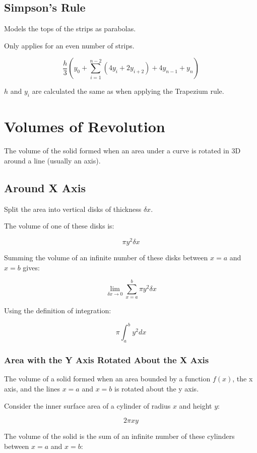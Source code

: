 \documentclass[a4paper,11pt]{report}
\begin{document}
\subsection{Simpson's Rule}

Models the tops of the strips as parabolas.

Only applies for an even number of strips.

$$
\frac{h}{3}(y_0 + \sum_{i = 1}^{n - 2} (4y_i + 2y_{i + 2}) + 4y_{n - 1} + y_n)
$$

$h$ and $y_i$ are calculated the same as when applying the Trapezium rule.


\section{Volumes of Revolution}

The volume of the solid formed when an area under a curve is rotated in 3D
around a line (usually an axis).

\subsection{Around X Axis}

Split the area into vertical disks of thickness $\delta x$.

The volume of one of these disks is:

$$
\pi y^2 \delta x
$$

Summing the volume of an infinite number of these disks between $x = a$ and
$x = b$ gives:

$$
\lim_{\delta x \to 0} \sum_{x = a}^{b} \pi y^2 \delta x
$$

Using the definition of integration:

$$
\pi \int^b_a y^2 dx
$$

\subsubsection{Area with the Y Axis Rotated About the X Axis}

The volume of a solid formed when an area bounded by a function $f(x)$, the x
axis, and the lines $x = a$ and $x = b$ is rotated about the y axis.

Consider the inner surface area of a cylinder of radius $x$ and height $y$:

$$
2 \pi x y
$$

The volume of the solid is the sum of an infinite number of these cylinders
between $x = a$ and $x = b$:
\end{document}
